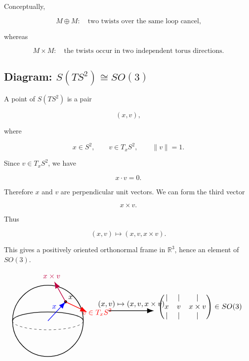 \documentclass[12pt,a4paper]{article}
\newcommand{\R}{\mathbb{R}}
\theoremstyle{notespace}
\begin{document}
	Conceptually,
	
	\[
	M\oplus M:
	\quad
	\text{two twists over the same loop cancel,}
	\]
	
	whereas
	
	\[
	M\times M:
	\quad
	\text{the twists occur in two independent torus directions.}
	\]
	
	\subsection{Diagram: \(S(TS^{2})\cong SO(3)\)}
	
	A point of \(S(TS^{2})\) is a pair
	
	\[
	(x,v),
	\]
	
	where
	
	\[
	x\in S^{2},
	\qquad
	v\in T_xS^{2},
	\qquad
	\|v\|=1.
	\]
	
	Since \(v\in T_xS^{2}\), we have
	
	\[
	x\cdot v=0.
	\]
	
	Therefore \(x\) and \(v\) are perpendicular unit vectors. We can form the third vector
	
	\[
	x\times v.
	\]
	
	Thus
	
	\[
	(x,v)\longmapsto (x,v,x\times v).
	\]
	
	This gives a positively oriented orthonormal frame in \(\R^{3}\), hence an element of \(SO(3)\).
	
	\[
	\resizebox{\textwidth}{!}{
		\begin{tikzpicture}[scale=1.1, every node/.style={font=\small}]
			
			\draw[thick] (0,0) circle (1.4);
			\draw[dashed] (-1.4,0) arc (180:360:1.4 and 0.35);
			\draw[thick] (1.4,0) arc (0:180:1.4 and 0.35);
			
			\filldraw[black] (0.7,0.75) circle (1.5pt);
			\node[above right] at (0.7,0.75) {\(x\)};
			
			\draw[-{Latex[length=3mm]}, thick, blue] (0,0) -- (0.7,0.75);
			\node[blue] at (0.25,0.55) {\(x\)};
			
			\draw[-{Latex[length=3mm]}, thick, red] (0.7,0.75) -- (1.55,0.35);
			\node[red] at (1.95,0.35) {\(v\in T_xS^2\)};
			
			\draw[-{Latex[length=3mm]}, thick, purple] (0.7,0.75) -- (0.25,1.55);
			\node[purple] at (0.15,1.75) {\(x\times v\)};
			
			\draw[-{Latex[length=3mm]}, thick] (2.4,0.4) -- (4.2,0.4);
			\node[above] at (3.3,0.4) {\((x,v)\mapsto(x,v,x\times v)\)};
			
			\node[right] at (4.25,0.55) {
				\(\displaystyle
				\begin{pmatrix}
					|&|&|\\
					x&v&x\times v\\
					|&|&|
				\end{pmatrix}
				\in SO(3)
				\)
			};
			
		\end{tikzpicture}
	}
	\]
	
\end{document}
